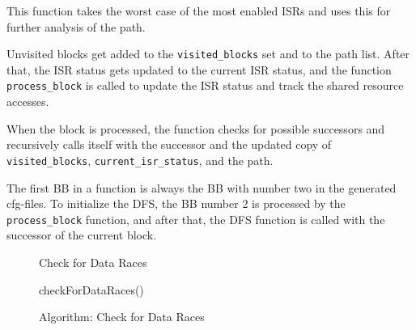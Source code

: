 \documentclass[
fancyheadings, %
%
%
]{stsreprt}
\begin{document}
{		This function takes the worst case of the most enabled \acp{ISR} and uses this for further analysis of the path.
		
		Unvisited blocks get added to the \texttt{visited\_blocks} set and to the path list. After that, the \ac{ISR} status gets updated to the current \ac{ISR} status, and the function \texttt{process\_block} is called to update the \ac{ISR} status and track the shared resource accesses.
		
		When the block is processed, the function checks for possible successors and recursively calls itself with the successor and the updated copy of \texttt{visited\_blocks}, \texttt{current\_isr\_status}, and the path.
		
		The first \ac{BB} in a function is always the \ac{BB} with number two in the generated cfg-files. To initialize the \ac{DFS}, the \ac{BB} number 2 is processed by the \texttt{process\_block} function, and after that, the \ac{DFS} function is called with the successor of the current block.
		
		
		\begin{figure}[H]
			\centering
			\begin{algorithm}[H]
				\caption{Check for Data Races}
				\DontPrintSemicolon
				\SetAlgoLined
				\BlankLine
				checkForDataRaces()\;
			\end{algorithm}
			\caption{Algorithm: Check for Data Races}
		\end{figure}
		\vspace{1cm}
		
}
\end{document}
